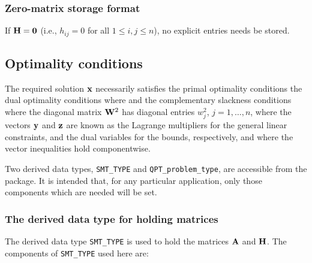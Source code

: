 \documentclass{galahad}
\newcommand{\packagename}{QPT}
\begin{document}
\subsubsection{Zero-matrix storage format}\label{zero}
If ${\mathbf{H}} = {\mathbf{0}}$ (i.e., $h_{ij} = 0$ for all $1 \leq i, j \leq n$),
no explicit entries needs be stored.


\subsection{Optimality conditions\label{galopt}}

The required solution ${\mathbf{x}}$ necessarily satisfies
the primal optimality conditions
the dual optimality conditions
where
and the complementary slackness conditions
where the diagonal matrix ${\mathbf{W}}^{2}$ has diagonal entries $w_{j}^{2}$,
$j = 1, \ldots , n$, where the vectors ${\mathbf{y}}$ and ${\mathbf{z}}$ are
known as the Lagrange multipliers for
the general linear constraints, and the dual variables for the bounds,
respectively, and where the vector inequalities hold componentwise.





\galtype
Two derived data types,
{\tt SMT\_TYPE} and
{\tt \packagename\_problem\_type},
are accessible from the package. It is intended that, for any particular
application, only those components which are needed will be set.


\subsubsection{The derived data type for holding matrices}\label{typesmt}
The derived data type {\tt SMT\_TYPE} is used to hold the matrices ${\mathbf{A}}$
and ${\mathbf{H}}$. The components of {\tt SMT\_TYPE} used here are:
\end{document}
